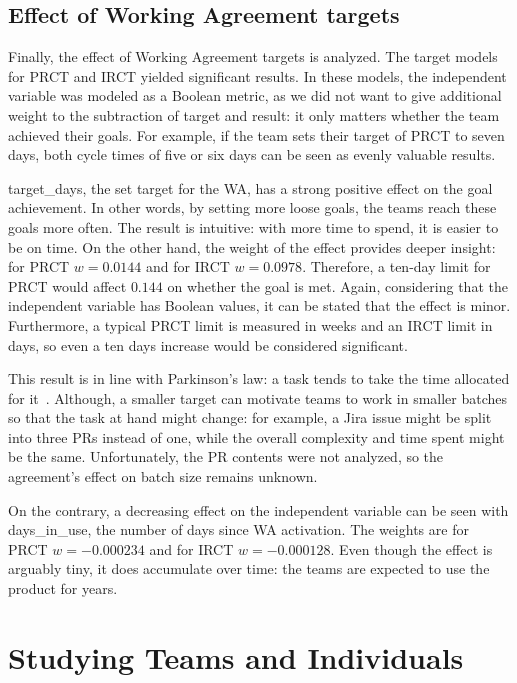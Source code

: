 \subsection{Effect of Working Agreement targets}

Finally, the effect of Working Agreement targets is analyzed. The target models for PRCT and IRCT yielded significant results. In these models, the independent variable was modeled as a Boolean metric, as we did not want to give additional weight to the subtraction of target and result: it only matters whether the team achieved their goals. For example, if the team sets their target of PRCT to seven days, both cycle times of five or six days can be seen as evenly valuable results.

target\_days, the set target for the WA, has a strong positive effect on the goal achievement. In other words, by setting more loose goals, the teams reach these goals more often. The result is intuitive: with more time to spend, it is easier to be on time. On the other hand, the weight of the effect provides deeper insight: for PRCT $w=0.0144$ and for IRCT $w=0.0978$. Therefore, a ten-day limit for PRCT would affect $0.144$ on whether the goal is met. Again, considering that the independent variable has Boolean values,  it can be stated that the effect is minor. Furthermore, a typical PRCT limit is measured in weeks and an IRCT limit in days, so even a ten days increase would be considered significant.

This result is in line with Parkinson's law: a task tends to take the time allocated for it~\cite{parkinson_cyril_parkinsons_1955}. Although, a smaller target can motivate teams to work in smaller batches so that the task at hand might change: for example, a Jira issue might be split into three PRs instead of one, while the overall complexity and time spent might be the same. Unfortunately, the PR contents were not analyzed, so the agreement's effect on batch size remains unknown.

On the contrary, a decreasing effect on the independent variable can be seen with days\_in\_use, the number of days since WA activation. The weights are for PRCT $w=-0.000234$ and for IRCT $w=-0.000128$. Even though the effect is arguably tiny, it does accumulate over time: the teams are expected to use the product for years.

\section{Studying Teams and Individuals}

